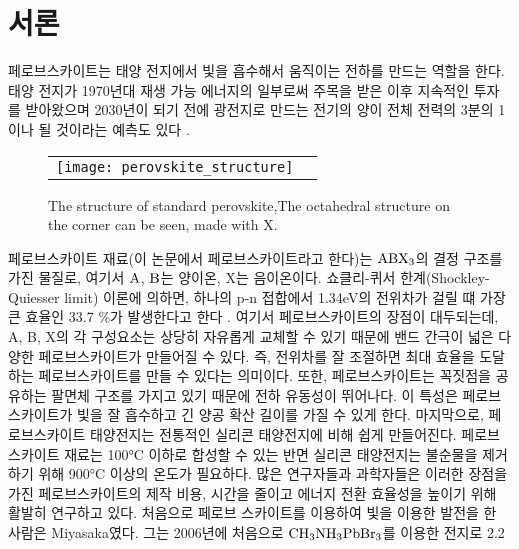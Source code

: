 
\section{서론}

페로브스카이트는 태양 전지에서 빛을 흡수해서 움직이는 전하를 만드는 역할을 한다. 태양 전지가 1970년대 재생 가능 에너지의 일부로써 주목을 받은 이후 지속적인 투자를 받아왔으며 2030년이 되기 전에 광전지로 만드는 전기의 양이 전체 전력의 3분의 1이나 될 것이라는 예측도 있다 \cite{turner2013global}. 
\begin{figure}[h!]
	\begin{center}
		\begin{tabular}{cc}
			\texttt{[image: perovskite\_structure]} 
		\end{tabular}
		\caption{The structure of standard perovskite\cite{turner2013global},The octahedral structure on the corner can be seen, made with X. }	
		\label{fig:FIR22}
	\end{center}
\end{figure}
페로브스카이트 재료(이 논문에서 페로브스카이트라고 한다)는 $\rm{ABX_3}$의 결정 구조를 가진 물질로, 여기서 $\rm{A}$, $\rm{B}$는 양이온, X는 음이온이다. 쇼클리-퀴서 한계(Shockley-Quiesser limit) 이론에 의하면, 하나의 p-n 접합에서 1.34eV의 전위차가 걸릴 떄 가장 큰 효율인 33.7 \%가 발생한다고 한다 \cite{ruhle2016tabulated}. 여기서 페로브스카이트의 장점이 대두되는데, A, B, X의 각 구성요소는 상당히 자유롭게 교체할 수 있기 때문에 밴드 간극이 넓은 다양한 페로브스카이트가 만들어질 수 있다. 즉, 전위차를 잘 조절하면 최대 효율을 도달하는 페로브스카이트를 만들 수 있다는 의미이다. 또한, 페로브스카이트는 꼭짓점을 공유하는 팔면체 구조를 가지고 있기 때문에 전하 유동성이 뛰어나다\cite{linaburg2015studies}. 이 특성은 페로브스카이트가 빛을 잘 흡수하고 긴 양공 확산 길이를 가질 수 있게 한다. 마지막으로, 페로브스카이트 태양전지는 전통적인 실리콘 태양전지에 비해 쉽게 만들어진다. 페로브스카이트 재료는 100°C 이하로 합성할 수 있는 반면 실리콘 태양전지는 불순물을 제거하기 위해 900°C 이상의 온도가 필요하다.
많은 연구자들과 과학자들은 이러한 장점을 가진 페로브스카이트의 제작 비용, 시간을 줄이고 에너지 전환 효율성을 높이기 위해 활발히 연구하고 있다. 처음으로 페로브 스카이트를 이용하여 빛을 이용한 발전을 한 사람은 Miyasaka였다. 그는 2006년에 처음으로 $\rm{CH_3NH_3PbBr_3}$를 이용한 전지로 2.2%
